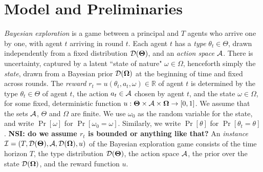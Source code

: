 \section{Model and Preliminaries}
\label{sec:model}

\emph{Bayesian exploration} is a game between a principal and $T$ agents who arrive one by one, with agent $t$ arriving in round $t$. Each agent $t$ has a {\em type} $\theta_t\in\varTheta$, drawn independently from a fixed distribution $\mathcal{D}(\bold{\Theta})$, and an {\em action space} $\mathcal{A}$.  There is uncertainty, captured by a latent ``state of nature" $\omega\in \varOmega$, henceforth simply the \emph{state}, drawn from a Bayesian prior $\mathcal{D}(\bold{\Omega})$ at the beginning of time and fixed across rounds. The {\em reward} $r_t = u(\theta_t,a_t,\omega)\in\mathbb{R}$ of agent $t$ is determined by the type $\theta_t\in\varTheta$ of agent $t$, the action $a_t\in\mathcal{A}$ chosen by agent $t$, and the state $\omega\in\varOmega$, for some fixed, deterministic function
$u:\bold{\Theta}\times \mathcal{A} \times \bold{\Omega} \to [0,1]$.  We assume that the sets $\mathcal{A}$, $\varTheta$ and $\varOmega$ are finite. We use $\omega_0$ as the random variable for the state, and write $\Pr[\omega]$ for $\Pr[\omega_0=\omega]$. Similarly, we write $\Pr[\theta]$ for $\Pr[\theta_t=\theta]$. {\bf NSI: do we assume $r_t$ is bounded or anything like that?}
An {\em instance} $\mathcal{I}=(T,\mathcal{D}(\bold{\Theta}),\mathcal{A},\mathcal{D}(\bold{\Omega}),u)$ of the Bayesian exploration game consists of the time horizon $T$, the type distribution $\mathcal{D}(\bold{\Theta})$, the action space $\mathcal{A}$, the prior over the state $\mathcal{D}(\bold{\Omega})$, and the reward function $u$.


